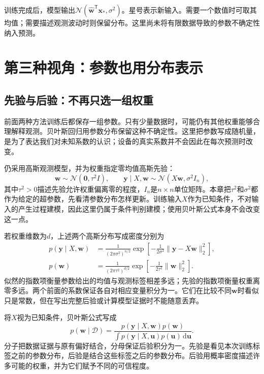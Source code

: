 训练完成后，模型输出$\mathcal N(\hat{\bm w}^{\mathsf T}\bm x_*,\sigma^2)$。星号表示新输入。需要一个数值时可取其均值；需要描述观测波动时则保留分布。这里尚未将有限数据导致的参数不确定性纳入预测。

\section{第三种视角：参数也用分布表示}
\subsection{先验与后验：不再只选一组权重}
前面两种方法训练后都保存一组参数。只有少量数据时，可能仍有其他权重能够合理解释观测。贝叶斯回归用参数分布保留这种不确定性\cite{bishop2006pattern,murphy2022pml}。这里把参数写成随机量，是为了表达我们对未知系数的认识；设备的真实系数并不会因此在每次预测时改变。

仍采用高斯观测模型，并为权重指定零均值高斯先验：
\begin{equation}
 \bm w\sim\mathcal N(\bm0,\tau^2I),\qquad
 \bm y\mid X,\bm w\sim\mathcal N(X\bm w,\sigma^2I_n),
\end{equation}
其中$\tau^2>0$描述先验允许权重偏离零的程度，$I_n$是$n\times n$单位矩阵。本章把$\tau^2$和$\sigma^2$都作为给定的超参数，先看清参数分布怎样更新。训练输入$X$作为已知条件，不对输入的产生过程建模，因此这里仍属于条件判别建模；使用贝叶斯公式本身不会改变这一点。

若权重维数为$d$，上述两个高斯分布写成密度分别为
\begin{align}
 p(\bm y\mid X,\bm w)
 &=\frac{1}{(2\pi\sigma^2)^{n/2}}
 \exp\left[-\frac{1}{2\sigma^2}
 \|\bm y-X\bm w\|_2^2\right],\label{eq:linear-gaussian-likelihood}\\
 p(\bm w)
 &=\frac{1}{(2\pi\tau^2)^{d/2}}
 \exp\left[-\frac{1}{2\tau^2}\|\bm w\|_2^2\right].
 \label{eq:linear-gaussian-prior-density}
\end{align}
似然的指数项衡量参数给出的均值与观测标签相差多远；先验的指数项衡量权重离零多远。两个前面的系数保证各自对相应变量积分为一。它们在比较不同$\bm w$时看似只是常数，但在写出完整后验或计算模型证据时不能随意丢弃。

将$X$视为已知条件，贝叶斯公式写成
\begin{equation}
 p(\bm w\mid\mathcal D)=
 \frac{p(\bm y\mid X,\bm w)p(\bm w)}
 {\int p(\bm y\mid X,\bm u)p(\bm u)\,\mathrm d\bm u}.
\end{equation}
分子把数据证据与原有偏好结合，分母保证后验积分为一。先验是看见本次训练标签之前的参数分布，后验是结合这些标签之后的参数分布。后验用概率密度描述许多可能的权重，并为它们赋予不同的可信程度。

